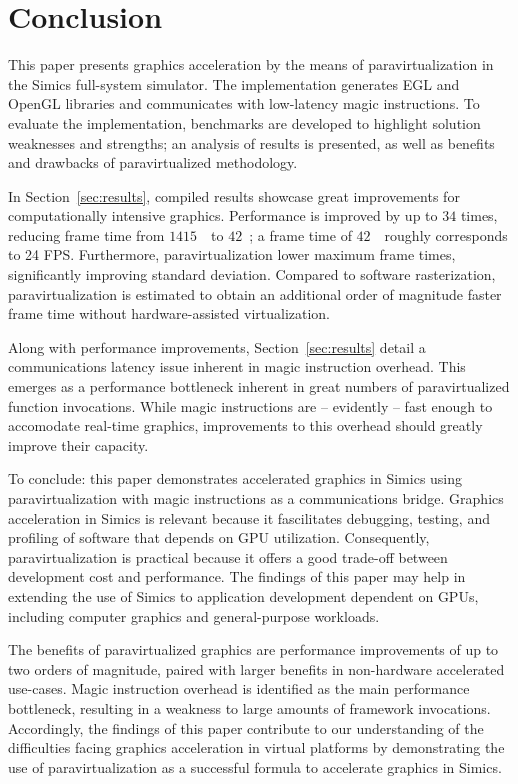 \section{Conclusion}
\label{sec:conclusion}
This paper presents graphics acceleration by the means of paravirtualization in the Simics full-system simulator.
The implementation generates EGL and OpenGL libraries and communicates with low-latency magic instructions.
To evaluate the implementation, benchmarks are developed to highlight solution weaknesses and strengths; an analysis of results is presented, as well as benefits and drawbacks of paravirtualized methodology.

In Section~\ref{sec:results}, compiled results showcase great improvements for computationally intensive graphics.
Performance is improved by up to $34$ times, reducing frame time from $1415$~\milli\second\ to $42$~\milli\second ; a frame time of $42$~\milli\second\ roughly corresponds to 24 FPS.
Furthermore, paravirtualization lower maximum frame times, significantly improving standard deviation.
Compared to software rasterization, paravirtualization is estimated to obtain an additional order of magnitude faster frame time without hardware-assisted virtualization.

Along with performance improvements, Section~\ref{sec:results} detail a communications latency issue inherent in magic instruction overhead.
This emerges as a performance bottleneck inherent in great numbers of paravirtualized function invocations.
While magic instructions are -- evidently -- fast enough to accomodate real-time graphics, improvements to this overhead should greatly improve their capacity.

To conclude: this paper demonstrates accelerated graphics in Simics using paravirtualization with magic instructions as a communications bridge.
Graphics acceleration in Simics is relevant because it fascilitates debugging, testing, and profiling of software that depends on GPU utilization.
Consequently, paravirtualization is practical because it offers a good trade-off between development cost and performance.
The findings of this paper may help in extending the use of Simics to application development dependent on GPUs, including computer graphics and general-purpose workloads.

The benefits of paravirtualized graphics are performance improvements of up to two orders of magnitude, paired with larger benefits in non-hardware accelerated use-cases.
Magic instruction overhead is identified as the main performance bottleneck, resulting in a weakness to large amounts of framework invocations.
Accordingly, the findings of this paper contribute to our understanding of the difficulties facing graphics acceleration in virtual platforms by demonstrating the use of paravirtualization as a successful formula to accelerate graphics in Simics.
